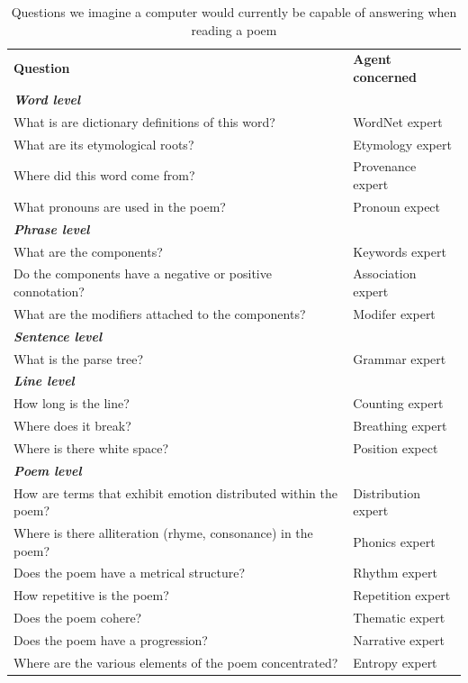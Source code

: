 


\begin{table}[t]
{\small
\def\arraystretch{1.1}
\begin{tabular}{p{1.8in}p{1in}}
\textbf{Question} & \textbf{Agent concerned} \\[.1cm]
\textbf{\emph{Word level}} & \\
What is are dictionary definitions of this word? & WordNet expert \\
What are its etymological roots? & Etymology expert \\
Where did this word come from? & Provenance expert \\
What pronouns are used in the poem? & Pronoun expect\\[.2cm]
\textbf{\emph{Phrase level}} & \\
What are the components? & Keywords expert \\
Do the components have a negative or positive connotation? & Association expert \\
What are the modifiers attached to the components? & Modifer expert \\[.5cm]
\textbf{\emph{Sentence level}} & \\
What is the parse tree? & Grammar expert \\[.2cm]
\textbf{\emph{Line level}} & \\
How long is the line? & Counting expert \\
Where does it break? & Breathing expert \\
Where is there white space? & Position expect\\[.2cm]
\textbf{\emph{Poem level}} & \\
How are terms that exhibit emotion distributed within the poem? & Distribution expert\\
Where is there alliteration (rhyme, consonance) in the poem? & Phonics expert \\
Does the poem have a metrical structure? & Rhythm expert \\
How repetitive is the poem? & Repetition expert \\
Does the poem cohere? & Thematic expert \\
Does the poem have a progression? & Narrative expert \\
Where are the various elements of the poem concentrated? & Entropy expert 
\end{tabular}
}
\caption{Questions we imagine a computer would currently be capable of answering when reading a poem\label{tab:questions_for_computational_agents}}
\end{table}

